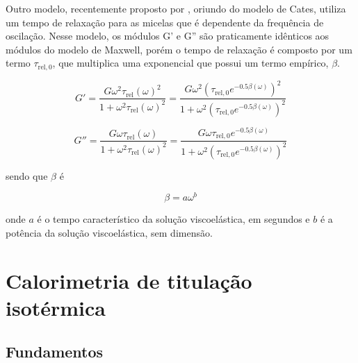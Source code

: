 			Outro modelo, recentemente proposto por \citeauthor{Garcia2018}, oriundo do modelo de Cates, utiliza um tempo de relaxação para as micelas que é dependente da frequência de oscilação. Nesse modelo, os módulos G' e G'' são praticamente idênticos aos módulos do modelo de Maxwell, porém o tempo de relaxação é composto por um termo \(\tau_{\textrm{rel}, 0}\), que multiplica uma exponencial que possui um termo empírico, \(\beta\). 
			
			\begin{equation}
			G' = \dfrac{ G \omega^2 \tau_{\textrm{rel}}(\omega)^2   }{  1 + \omega^2 \tau_{\textrm{rel}}(\omega)^2  } = %
				 \dfrac{ G \omega^2 \left(  \tau_{\textrm{rel}, 0} e^{-0.5\beta(\omega)}  \right)^2   }{  1 + \omega^2 \left(  \tau_{\textrm{rel}, 0} e^{-0.5\beta(\omega)}  \right)^2  }
			\label{eqn:garcia_saraji_g1}
			\end{equation}
			
			\begin{equation}
			G'' = \dfrac{ G \omega \tau_{\textrm{rel}}(\omega)   }{  1 + \omega^2 \tau_{\textrm{rel}}(\omega)^2  } = %
			      \dfrac{ G \omega \tau_{\textrm{rel}, 0} e^{-0.5\beta(\omega)}   }{  1 + \omega^2 \left(  \tau_{\textrm{rel}, 0} e^{-0.5\beta(\omega)}  \right)^2  }
			\label{eqn:garcia_saraji_g2}
			\end{equation}
			
			\noindent sendo que \(\beta\) é
			
			\begin{equation}
				\beta = a \omega^b
			\end{equation}
			
			\noindent onde \(a\) é o tempo característico da solução viscoelástica, em segundos e \(b\) é a potência da solução viscoelástica, sem dimensão.
			
	\chapter{Calorimetria de titulação isotérmica}  
	
		\section{Fundamentos} 
		
		

